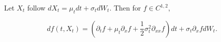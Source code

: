 Let $X_t$ follow $dX_t = \mu_t dt + \sigma_t dW_t$. Then for $f \in C^{1,2}$,

\[
df(t, X_t) = \left( \partial_t f + \mu_t \partial_x f + \frac{1}{2} \sigma_t^2 \partial_{xx} f \right) dt + \sigma_t \partial_x f dW_t.
\]
